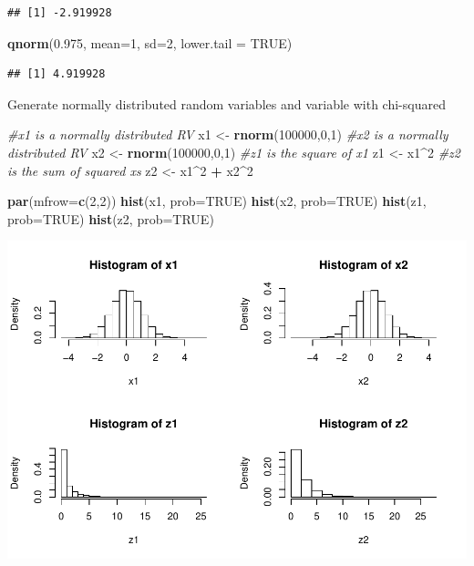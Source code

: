 \documentclass[
]{book}
\newenvironment{Shaded}{\begin{snugshade}}{\end{snugshade}}
\newcommand{\CommentTok}[1]{\textcolor[rgb]{0.56,0.35,0.01}{\textit{#1}}}
\newcommand{\DataTypeTok}[1]{\textcolor[rgb]{0.13,0.29,0.53}{#1}}
\newcommand{\DecValTok}[1]{\textcolor[rgb]{0.00,0.00,0.81}{#1}}
\newcommand{\FloatTok}[1]{\textcolor[rgb]{0.00,0.00,0.81}{#1}}
\newcommand{\KeywordTok}[1]{\textcolor[rgb]{0.13,0.29,0.53}{\textbf{#1}}}
\newcommand{\NormalTok}[1]{#1}
\newcommand{\OperatorTok}[1]{\textcolor[rgb]{0.81,0.36,0.00}{\textbf{#1}}}
\newcommand{\OtherTok}[1]{\textcolor[rgb]{0.56,0.35,0.01}{#1}}
\newcommand{\StringTok}[1]{\textcolor[rgb]{0.31,0.60,0.02}{#1}}
\begin{document}
\begin{verbatim}
## [1] -2.919928
\end{verbatim}

\begin{Shaded}
\begin{Highlighting}[]
\KeywordTok{qnorm}\NormalTok{(}\FloatTok{0.975}\NormalTok{, }\DataTypeTok{mean=}\DecValTok{1}\NormalTok{, }\DataTypeTok{sd=}\DecValTok{2}\NormalTok{, }\DataTypeTok{lower.tail =} \OtherTok{TRUE}\NormalTok{)}
\end{Highlighting}
\end{Shaded}

\begin{verbatim}
## [1] 4.919928
\end{verbatim}

Generate normally distributed random variables and variable with chi-squared

\begin{Shaded}
\begin{Highlighting}[]
\CommentTok{#x1 is a normally distributed RV}
\NormalTok{x1 <-}\StringTok{ }\KeywordTok{rnorm}\NormalTok{(}\DecValTok{100000}\NormalTok{,}\DecValTok{0}\NormalTok{,}\DecValTok{1}\NormalTok{)}
\CommentTok{#x2 is a normally distributed RV }
\NormalTok{x2 <-}\StringTok{ }\KeywordTok{rnorm}\NormalTok{(}\DecValTok{100000}\NormalTok{,}\DecValTok{0}\NormalTok{,}\DecValTok{1}\NormalTok{)}
\CommentTok{#z1 is the square of x1 }
\NormalTok{z1 <-}\StringTok{ }\NormalTok{x1}\OperatorTok{^}\DecValTok{2}
\CommentTok{#z2 is the sum of squared xs}
\NormalTok{z2 <-}\StringTok{ }\NormalTok{x1}\OperatorTok{^}\DecValTok{2} \OperatorTok{+}\StringTok{ }\NormalTok{x2}\OperatorTok{^}\DecValTok{2}

\KeywordTok{par}\NormalTok{(}\DataTypeTok{mfrow=}\KeywordTok{c}\NormalTok{(}\DecValTok{2}\NormalTok{,}\DecValTok{2}\NormalTok{))}
\KeywordTok{hist}\NormalTok{(x1, }\DataTypeTok{prob=}\OtherTok{TRUE}\NormalTok{)}
\KeywordTok{hist}\NormalTok{(x2, }\DataTypeTok{prob=}\OtherTok{TRUE}\NormalTok{)}
\KeywordTok{hist}\NormalTok{(z1, }\DataTypeTok{prob=}\OtherTok{TRUE}\NormalTok{)}
\KeywordTok{hist}\NormalTok{(z2, }\DataTypeTok{prob=}\OtherTok{TRUE}\NormalTok{)}
\end{Highlighting}
\end{Shaded}

\includegraphics{Metrics_files/figure-latex/unnamed-chunk-12-1.pdf}
\end{document}
